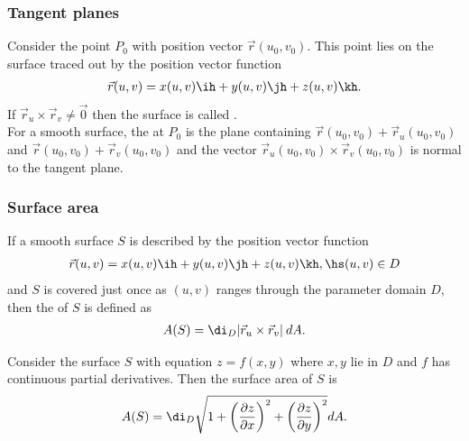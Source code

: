 \documentclass{article}
\begin{document}
\subsubsection{Tangent planes}

\begin{definition}
    Consider the point $P_0$ with position vector $\vec r(u_0, v_0)$. This point lies
    on the surface traced out by the position vector function
    \begin{align*}
        \vec r(u,v) = x(u,v)\ih + y(u,v)\jh + z(u,v)\kh.
    \end{align*}
    If $\vec r_u \times\vec r_v\not=\vec 0$ then the surface is called .\\
     For a smooth surface, the  at $P_0$ is the plane containing
              $\vec r(u_0,v_0)+\vec r_u(u_0,v_0)$ and $\vec r(u_0,v_0)+\vec r_v(u_0,v_0)$ and the vector
              $\vec r_u(u_0,v_0)\times \vec r_v(u_0,v_0)$ is normal to the tangent plane.

\end{definition}

\subsubsection{Surface area}

\begin{definition}
    If a smooth surface $S$ is described by the position vector function
    \begin{align*}
        \vec r(u,v) = x(u,v)\ih + y(u,v)\jh + z(u,v)\kh,\hs (u,v)\in D
    \end{align*}
    and $S$ is covered just once as $(u,v)$ ranges through the parameter domain $D$,
    then the  of $S$ is defined as
    \begin{align*}
        A(S)=\di_D |\vec r_u \times \vec r_v|\:dA.
    \end{align*}
\end{definition}
\begin{theorem}
    Consider the surface $S$ with equation $z=f(x,y)$ where $x,y$ lie in $D$ and $f$
    has continuous partial derivatives. Then the surface area of $S$ is
    \begin{align*}
        A(S) = \di_D \sqrt{1+\left(\frac{\partial z}{\partial x}\right)^2 + \left(\frac{\partial z}{\partial y}\right)^2}dA.
    \end{align*}
\end{theorem}
\end{document}
